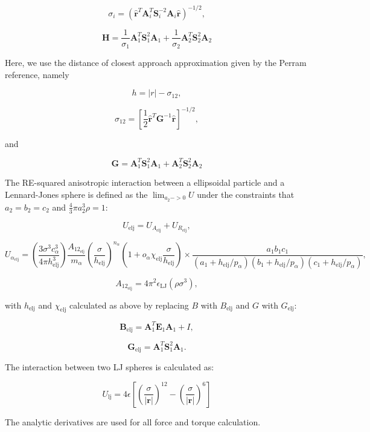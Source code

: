 $$ \sigma_i = (\hat{\mathbf{r}}^T\mathbf{A}_i^T\mathbf{S}_i^{-2}
\mathbf{A}_i\hat{\mathbf{r}})^{-1/2}, $$

$$ \mathbf{H} = \frac{1}{\sigma_1}\mathbf{A}_1^T \mathbf{S}_1^2 \mathbf{A}_1 +
\frac{1}{\sigma_2}\mathbf{A}_2^T \mathbf{S}_2^2 \mathbf{A}_2 $$

 
Here, we use the distance of closest approach approximation given by the
Perram reference, namely

$$ h = |r| - \sigma_{12}, $$

$$ \sigma_{12} = [ \frac{1}{2} \hat{\mathbf{r}}^T
\mathbf{G}^{-1} \hat{\mathbf{r}}]^{ -1/2 }, $$

and

$$ \mathbf{G} = \mathbf{A}_1^T \mathbf{S}_1^2 \mathbf{A}_1 +
\mathbf{A}_2^T \mathbf{S}_2^2 \mathbf{A}_2 $$

\vspace{0.3in}

The RE-squared anisotropic interaction between a 
ellipsoidal particle and a Lennard-Jones sphere is defined
as the $\lim_{a_2->0}U$ under the constraints that
$a_2=b_2=c_2$ and $\frac{4}{3}\pi a_2^3\rho=1$:

$$ U_{\mathrm{elj}}=U_{A_{\mathrm{elj}}}+U_{R_{\mathrm{elj}}}, $$

$$ U_{\alpha_{\mathrm{elj}}}=(\frac{3\sigma^3c_\alpha^3}
{4\pi h_{\mathrm{elj}}^3})\frac{A_{12_{\mathrm{elj}}}}
{m_\alpha}(\frac\sigma{h_{\mathrm{elj}}})^{n_\alpha}
(1+o_\alpha\chi_{\mathrm{elj}}\frac\sigma{h_{\mathrm{elj}}}) \times 
\frac{a_1b_1c_1}{(a_1+h_{\mathrm{elj}}/p_\alpha)
(b_1+h_{\mathrm{elj}}/p_\alpha)(c_1+h_{\mathrm{elj}}/p_\alpha)}, $$

$$ A_{12_{\mathrm{elj}}}=4\pi^2\epsilon_{\mathrm{LJ}}(\rho\sigma^3), $$

with $h_{\mathrm{elj}}$ and $\chi_{\mathrm{elj}}$ calculated as above 
by replacing $B$ with $B_{\mathrm{elj}}$ and $G$ with $G_{\mathrm{elj}}$:

$$ \mathbf{B}_{\mathrm{elj}} = \mathbf{A}_1^T \mathbf{E}_1 \mathbf{A}_1 + I, $$

$$ \mathbf{G}_{\mathrm{elj}} = \mathbf{A}_1^T \mathbf{S}_1^2 \mathbf{A}_1.$$

\vspace{0.3in}

The interaction between two LJ spheres is calculated as:

$$
 U_{\mathrm{lj}} = 4 \epsilon \left[ \left(\frac{\sigma}{|\mathbf{r}|}\right)^{12} - 
                       \left(\frac{\sigma}{|\mathbf{r}|}\right)^6 \right]
$$

\vspace{0.3in}

The analytic derivatives are used for all force and torque calculation.


